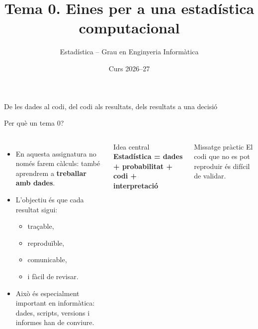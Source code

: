 \documentclass[10pt,aspectratio=169]{beamer}
\title[Tema 0: eines computacionals]{Tema 0. Eines per a una estadística computacional}
\author{Estadística -- Grau en Enginyeria Informàtica}
\date{Curs 2026--27}
\newcommand{\important}[1]{\textcolor{UABGreen}{\textbf{#1}}}
\begin{document}
\begin{frame}[plain]
  \titlepage
  \vspace{-0.4cm}
  \begin{center}
  \small
  \textcolor{DeepBlue}{De les dades al codi, del codi als resultats, dels resultats a una decisió}
  \end{center}
\end{frame}

\begin{frame}{Per què un tema 0?}
\begin{columns}[T]
\begin{itemize}
  \item En aquesta assignatura no només farem càlculs: també aprendrem a \important{treballar amb dades}.
  \item L'objectiu és que cada resultat sigui:
  \begin{itemize}
    \item traçable,
    \item reproduïble,
    \item comunicable,
    \item i fàcil de revisar.
  \end{itemize}
  \item Això és especialment important en informàtica: dades, scripts, versions i informes han de conviure.
\end{itemize}

\begin{block}{Idea central}
\centering
\large
\important{Estadística = dades + probabilitat + codi + interpretació}
\end{block}
\vspace{0.2cm}
\begin{alertblock}{Missatge pràctic}
El codi que no es pot reproduir és difícil de validar.
\end{alertblock}
\end{columns}
\end{frame}
\end{document}
